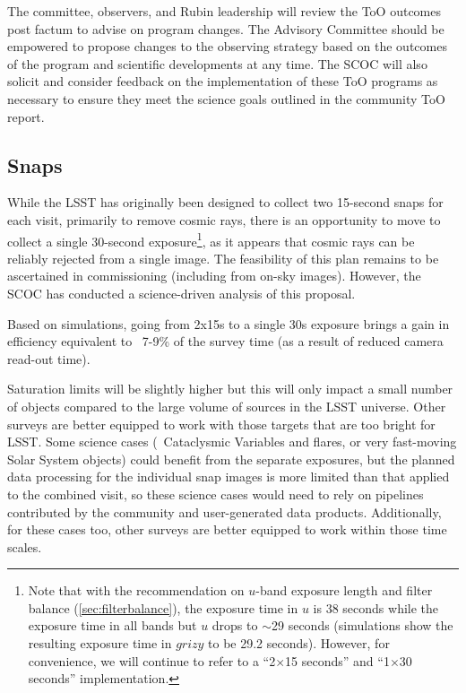 The committee, observers, and Rubin leadership will review the ToO outcomes post factum to advise on program changes. The Advisory Committee should be empowered to propose changes to the observing strategy based on the outcomes of the program and scientific developments at any time. The SCOC will also solicit and consider feedback on the implementation of these ToO programs as necessary to ensure they meet the science goals outlined in the community ToO report. 



\subsection{Snaps}\label{sec:snaps}


While the LSST has originally been designed to collect two 15-second snaps for each visit, primarily to remove cosmic rays, there is an opportunity to move to collect a single 30-second exposure\footnote{Note that with the recommendation on $u$-band exposure length and filter balance (\autoref{sec:filterbalance}), the exposure time in $u$ is 38 seconds while the exposure time in all bands but $u$ drops to \mbox{$\sim$29} seconds (simulations show the resulting exposure time in $grizy$ to be 29.2 seconds). However, for convenience, we will continue to refer to a ``\mbox{2$\times$15} seconds'' and ``\mbox{1$\times$30} seconds'' implementation.}, as it appears that cosmic rays can be reliably rejected from a single image. The feasibility of this plan remains to be ascertained in commissioning (including from on-sky images). However, the SCOC has conducted a science-driven analysis of this proposal. 

Based on simulations, going from 2x15s to a single 30s exposure brings a gain in efficiency equivalent to ~7-9\% of the survey time (as a result of reduced camera read-out time). 


Saturation limits will be slightly higher but this will only impact a small number of objects compared to the large volume of sources in the LSST universe. Other surveys are better equipped to work with those targets that are too bright for LSST.
Some science cases (\eg\ Cataclysmic Variables and flares, or very fast-moving Solar System objects) could benefit from the separate exposures, but the planned data processing for the individual snap images is more limited than that applied to the combined visit, so these science cases would need to rely on pipelines contributed by the community and user-generated data products. Additionally, for these cases too, other surveys are better equipped to work within those time scales.

